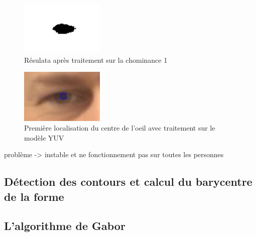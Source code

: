 \begin{figure}[H]
 \center
 \includegraphics[width=4cm]{image/pupille.png}
 \caption{Résulata après traitement sur la chominance 1}
\end{figure}

\begin{figure}[H]
 \center
 \includegraphics[width=4cm]{image/localisation1.png}
 \caption{Première localisation du centre de l'oeil avec traitement sur le modèle YUV}
\end{figure}

problème -> instable et ne fonctionnement pas sur toutes les personnes

\subsection{Détection des contours et calcul du barycentre de la forme}

\subsection{L'algorithme de Gabor}